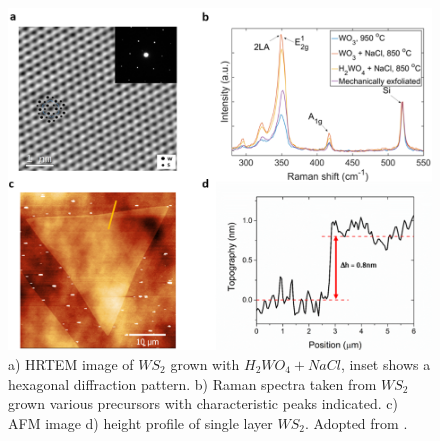 \begin{figure}[h]
	\begin{center}
		\includegraphics[scale=0.3]{PaperAFM.png}
		\caption{a) HRTEM image of $WS_2$ grown with $H_2WO_4+NaCl$, inset shows a hexagonal diffraction pattern. b) Raman spectra taken from $WS_2$ grown various precursors with characteristic peaks indicated. c) AFM image d) height profile of single layer $WS_2$. Adopted from \cite{Reale2017}.}
		\label{fig:PaperAFM}
	\end{center}
\end{figure}

